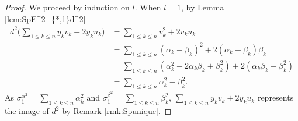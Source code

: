 \documentclass{article}
\theoremstyle{plain}
\theoremstyle{definition}
\numberwithin{thm}{section}
\begin{document}
		\begin{proof}
			We proceed by induction on $l$.
			When $l=1$, by Lemma \ref{lem:SpE^2_{*,1}d^2} 
			\begin{align*}
				d^2\big(\sum_{1\leq k\leq n}{y_kv_k+2y_ku_k}\big)&=\sum_{1\leq k\leq n}{v_k^2+2v_ku_k} \\
				&=\sum_{1\leq k \leq n}{(\alpha_k-\beta_k)^2+2(\alpha_k-\beta_k)\beta_k} \\
				&=\sum_{1\leq k \leq n}{(\alpha_k^2-2\alpha_k\beta_k+\beta_k^2)+2(\alpha_k\beta_k-\beta_k^2)} \\
				&=\sum_{1\leq k \leq n}{\alpha_k^2-\beta_k^2}.
			\end{align*}
			As $\sigma_1^{\alpha^2}=\sum_{1\leq k \leq n}{\alpha_k^2}$ and $\sigma_1^{\beta^2}=\sum_{1\leq k \leq n}{\beta_k^2}$,
			$\sum_{1\leq k\leq n}{y_kv_k+2y_ku_k}$ represents the image of $d^2$ by Remark \ref{rmk:Spunique}.
			

\end{proof}
\end{document}
